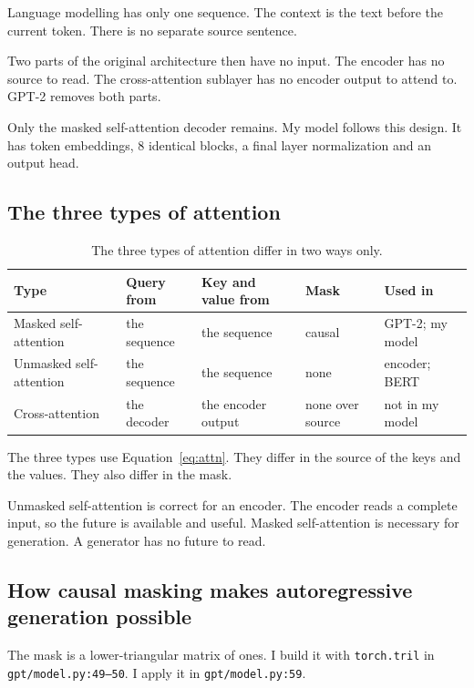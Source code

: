 \documentclass[11pt,a4paper]{article}
\newcommand{\code}[1]{\texttt{#1}}
\begin{document}
Language modelling has only one sequence. The context is the text before the current token. There
is no separate source sentence.

Two parts of the original architecture then have no input. The encoder has no source to read. The
cross-attention sublayer has no encoder output to attend to. GPT-2 removes both parts.

Only the masked self-attention decoder remains. My model follows this design. It has token
embeddings, 8 identical blocks, a final layer normalization and an output head.

\subsection{The three types of attention}

\begin{table}[htbp]\centering\small
\begin{tabular}{@{}lllll@{}}
\toprule
\textbf{Type} & \textbf{Query from} & \textbf{Key and value from} & \textbf{Mask} & \textbf{Used in} \\
\midrule
Masked self-attention & the sequence & the sequence & causal & GPT-2; my model \\
Unmasked self-attention & the sequence & the sequence & none & encoder; BERT \\
Cross-attention & the decoder & the encoder output & none over source & not in my model \\
\bottomrule
\end{tabular}
\caption{The three types of attention differ in two ways only.}
\end{table}

The three types use Equation~\ref{eq:attn}. They differ in the source of the keys and the values.
They also differ in the mask.

Unmasked self-attention is correct for an encoder. The encoder reads a complete input, so the
future is available and useful. Masked self-attention is necessary for generation. A generator has
no future to read.

\subsection{How causal masking makes autoregressive generation possible}

The mask is a lower-triangular matrix of ones. I build it with \code{torch.tril} in
\code{gpt/model.py:49--50}. I apply it in \code{gpt/model.py:59}.
\end{document}
